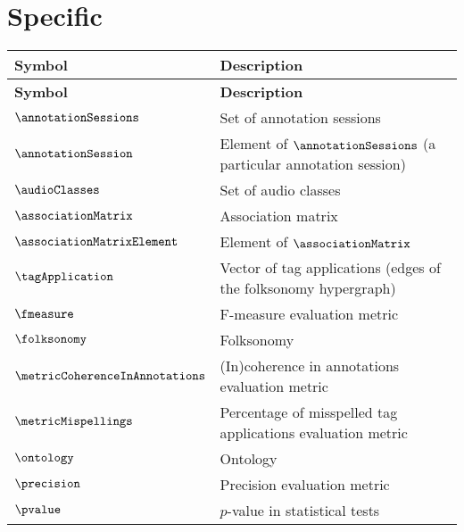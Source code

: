 \section*{Specific}
\vspace{-0.3cm}
\begin{longtable}{p{1.4cm}p{11.1cm}}
\toprule
\textbf{Symbol}              & \textbf{Description} \\
\midrule
\endfirsthead

\textbf{Symbol}              & \textbf{Description} \\
\midrule
\endhead

\bottomrule
\endlastfoot

\bottomrule
\endfoot
   $\annotationSessions$                            & Set of annotation sessions
\\ $\annotationSession$                             & Element of $\annotationSessions$ (a particular annotation session)
\\ $\audioClasses$                                  & Set of audio classes
\\ $\associationMatrix$                             & Association matrix
\\ $\associationMatrixElement$                      & Element of $\associationMatrix$
\\ $\tagApplication$                                & Vector of tag applications (edges of the folksonomy hypergraph)
\\ $\fmeasure$                                      & F-measure evaluation metric
\\ $\folksonomy$                                    & Folksonomy
\\ $\metricCoherenceInAnnotations$					& (In)coherence in annotations evaluation metric
\\ $\metricMispellings$								& Percentage of misspelled tag applications evaluation metric
\\ $\ontology$										& Ontology
\\ $\precision$                                     & Precision evaluation metric
\\ $\pvalue$                                        & $p$-value in statistical tests

\end{longtable}
